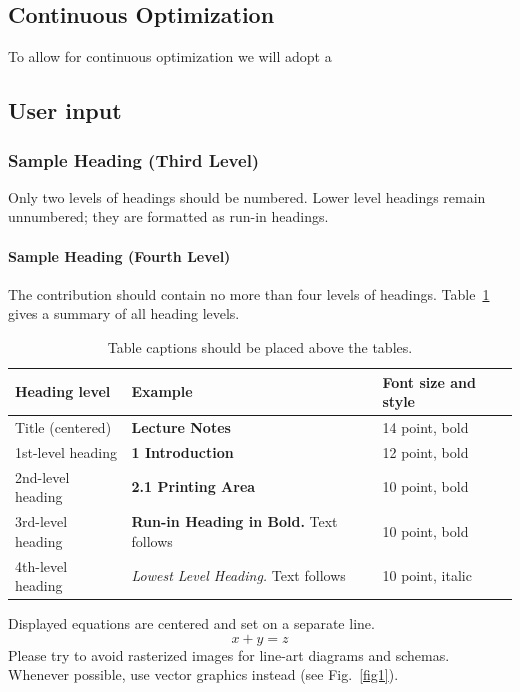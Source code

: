 \documentclass[runningheads]{llncs}
\begin{document}
\subsection{Continuous Optimization}
To allow for continuous optimization we will adopt a 

\subsection{User input}



\subsubsection{Sample Heading (Third Level)} Only two levels of
headings should be numbered. Lower level headings remain unnumbered;
they are formatted as run-in headings.

\paragraph{Sample Heading (Fourth Level)}
The contribution should contain no more than four levels of
headings. Table~\ref{tab1} gives a summary of all heading levels.

\begin{table}
\caption{Table captions should be placed above the
tables.}\label{tab1}
\begin{tabular}{|l|l|l|}
\hline
Heading level &  Example & Font size and style\\
\hline
Title (centered) &  {\Large\bfseries Lecture Notes} & 14 point, bold\\
1st-level heading &  {\large\bfseries 1 Introduction} & 12 point, bold\\
2nd-level heading & {\bfseries 2.1 Printing Area} & 10 point, bold\\
3rd-level heading & {\bfseries Run-in Heading in Bold.} Text follows & 10 point, bold\\
4th-level heading & {\itshape Lowest Level Heading.} Text follows & 10 point, italic\\
\hline
\end{tabular}
\end{table}


\noindent Displayed equations are centered and set on a separate
line.
\begin{equation}
x + y = z
\end{equation}
Please try to avoid rasterized images for line-art diagrams and
schemas. Whenever possible, use vector graphics instead (see
Fig.~\ref{fig1}).
\end{document}
